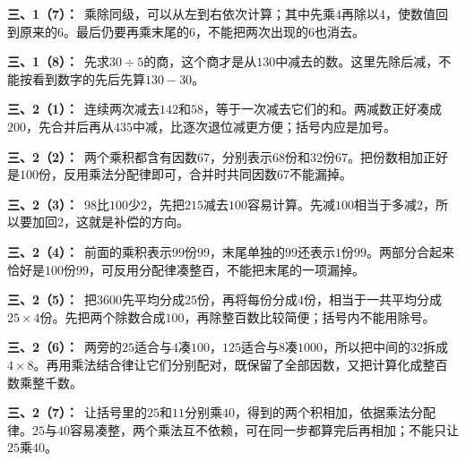 \documentclass[multi=snippet,border=0pt]{standalone}
\newenvironment{snippet}[3]{\begin{minipage}{#1bp}\color{answerred}\fontsize{#2}{#3}\selectfont\raggedright}{\end{minipage}}
\begin{document}
\begin{snippet}{505}{11.5}{14}\textbf{三、1（7）：}\ 乘除同级，可以从左到右依次计算；其中先乘\(4\)再除以\(4\)，使数值回到原来的\(6\)。最后仍要再乘末尾的\(6\)，不能把两次出现的\(6\)也消去。\end{snippet}
\begin{snippet}{505}{11.5}{14}\textbf{三、1（8）：}\ 先求\(30\div5\)的商，这个商才是从\(130\)中减去的数。这里先除后减，不能按看到数字的先后先算\(130-30\)。\end{snippet}
\begin{snippet}{505}{11.5}{14}\textbf{三、2（1）：}\ 连续两次减去\(142\)和\(58\)，等于一次减去它们的和。两减数正好凑成\(200\)，先合并后再从\(435\)中减，比逐次退位减更方便；括号内应是加号。\end{snippet}
\begin{snippet}{505}{11.5}{14}\textbf{三、2（2）：}\ 两个乘积都含有因数\(67\)，分别表示\(68\)份和\(32\)份\(67\)。把份数相加正好是\(100\)份，反用乘法分配律即可，合并时共同因数\(67\)不能漏掉。\end{snippet}
\begin{snippet}{505}{11.5}{14}\textbf{三、2（3）：}\ \(98\)比\(100\)少\(2\)，先把\(215\)减去\(100\)容易计算。先减\(100\)相当于多减\(2\)，所以要加回\(2\)，这就是补偿的方向。\end{snippet}
\begin{snippet}{505}{11.5}{14}\textbf{三、2（4）：}\ 前面的乘积表示\(99\)份\(99\)，末尾单独的\(99\)还表示\(1\)份\(99\)。两部分合起来恰好是\(100\)份\(99\)，可反用分配律凑整百，不能把末尾的一项漏掉。\end{snippet}
\begin{snippet}{505}{11.5}{14}\textbf{三、2（5）：}\ 把\(3600\)先平均分成\(25\)份，再将每份分成\(4\)份，相当于一共平均分成\(25\times4\)份。先把两个除数合成\(100\)，再除整百数比较简便；括号内不能用除号。\end{snippet}
\begin{snippet}{505}{11.5}{14}\textbf{三、2（6）：}\ 两旁的\(25\)适合与\(4\)凑\(100\)，\(125\)适合与\(8\)凑\(1000\)，所以把中间的\(32\)拆成\(4\times8\)。再用乘法结合律让它们分别配对，既保留了全部因数，又把计算化成整百数乘整千数。\end{snippet}
\begin{snippet}{505}{11.5}{14}\textbf{三、2（7）：}\ 让括号里的\(25\)和\(11\)分别乘\(40\)，得到的两个积相加，依据乘法分配律。\(25\)与\(40\)容易凑整，两个乘法互不依赖，可在同一步都算完后再相加；不能只让\(25\)乘\(40\)。\end{snippet}
\end{document}
